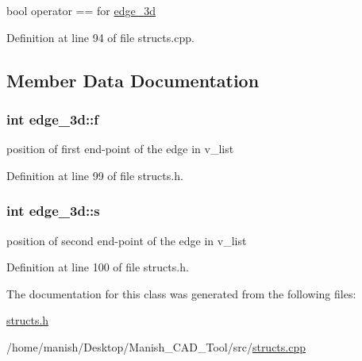bool operator == for \hyperlink{classedge__3d}{edge\+\_\+3d} 



Definition at line 94 of file structs.\+cpp.



\subsection{Member Data Documentation}
\subsubsection[{\texorpdfstring{f}{f}}]{\setlength{\rightskip}{0pt plus 5cm}int edge\+\_\+3d\+::f}\hypertarget{classedge__3d_a1365e6035d117feb008f996290507425}{}\label{classedge__3d_a1365e6035d117feb008f996290507425}


position of first end-\/point of the edge in v\+\_\+list 



Definition at line 99 of file structs.\+h.

\subsubsection[{\texorpdfstring{s}{s}}]{\setlength{\rightskip}{0pt plus 5cm}int edge\+\_\+3d\+::s}\hypertarget{classedge__3d_aa33edd90f3962b3caf4dd8780d3fd9fb}{}\label{classedge__3d_aa33edd90f3962b3caf4dd8780d3fd9fb}


position of second end-\/point of the edge in v\+\_\+list 



Definition at line 100 of file structs.\+h.



The documentation for this class was generated from the following files\+:\begin{DoxyCompactItemize}
\item 
\hyperlink{structs_8h}{structs.\+h}\item 
/home/manish/\+Desktop/\+Manish\+\_\+\+C\+A\+D\+\_\+\+Tool/src/\hyperlink{structs_8cpp}{structs.\+cpp}\end{DoxyCompactItemize}
